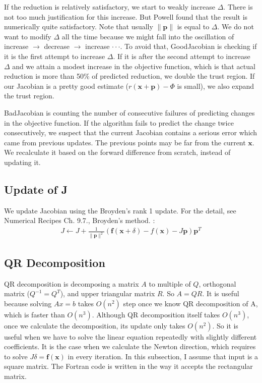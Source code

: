 \documentclass[12pt]{article}
\def\xb{{\mathbf{x}}}
\def\fb{{\mathbf{f}}}
\def\pb{{\mathbf{p}}}
\begin{document}
If the reduction is relatively satisfactory, we start to weakly increase $\Delta$. There is not
too much justification for this increase. But Powell found that the result is numerically quite
satisfactory. Note that usually $\|\pb\|$ is equal to $\Delta$.  We do not want to modify
$\Delta$ all the time because we might fall into the oscillation of increase $\rightarrow$
decrease $\rightarrow $ increase $\cdot \cdot \cdot$.  To avoid that, GoodJacobian is checking if
it is the first attempt to increase $\Delta$. If it is after the second attempt to increase $\Delta$ and
we attain a modest increase in the objective function, which is that actual reduction is more than 50\%
of predicted reduction, we double the trust region. If our Jacobian is a pretty good estimate
($r(\xb+\pb)-\Phi$ is small), we also expand the trust region.

BadJacobian is counting the number of consecutive failures of predicting changes in the objective
function. If the algorithm fails to predict the change twice consecutively, we suspect that
the current Jacobian contains a serious error which came from previous updates. The previous points may
be far from the current $\xb$. We recalculate it based on the forward difference from scratch, instead of
updating it.

\subsection{Update of J}
We update Jacobian using the Broyden's rank 1 update. For the detail, see Numerical Recipes
Ch. 9.7., Broyden's method.   :
\begin{align*}
  J \leftarrow J +\frac{1}{\|\pb\|^2} (\fb(\xb+\delta)-f(\xb) -J\pb )\pb^T
\end{align*}



\subsection{QR Decomposition}
QR decomposition is decomposing a matrix $A$ to multiple of $Q$, orthogonal matrix ($Q^{-1}=Q^T$),
and upper triangular matrix $R$. So $A=QR$. It is useful because solving $Ax=b$ takes $O(n^2)$
step once we know QR decomposition of A, which is faster than $O(n^3)$. Although QR decomposition
itself takes $O(n^3)$, once we calculate the decomposition, its update only takes $O(n^2)$. So it
is useful when we have to solve the linear equation repeatedly with slightly different
coefficients. It is the case when we calculate the Newton direction, which requires to solve
$J\delta = \fb(\xb)$ in every iteration. In this subsection, I assume that input is a square
matrix. The Fortran code is written in the way it accepts the rectangular matrix.
\end{document}
